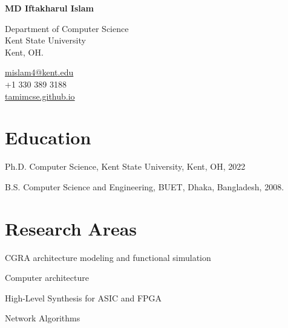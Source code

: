 \documentclass[11pt,letterpaper]{report}
\newcommand{\myname}{MD Iftakharul Islam}
\newcommand{\namefont}[1]{{\normalfont\bfseries\Huge{#1}}}
\newcommand{\listitemspace}{0.25em}
\renewenvironment{itemize}
{\begin{list}{}{\setlength{\leftmargin}{0em}
                \setlength{\parskip}{0em}
                \setlength{\itemsep}{\listitemspace}
                \setlength{\parsep}{\listitemspace}}}
{\end{list}}
\begin{document}
    \raggedright{}

    \namefont{\myname}

    \vspace{1em}
    \begin{minipage}[t]{0.700\textwidth}
        Department of Computer Science \\
        Kent State University \\
        Kent, OH.
    \end{minipage}
    \begin{minipage}[t]{0.295\textwidth}
        \flushright{}
        \href{mailto:mislam4@kent.edu}{mislam4@kent.edu} \\
        +1 330 389 3188 \\
        \href{https://tamimcse.github.io/}{tamimcse.github.io}
    \end{minipage}


    \section*{Education}

    \begin{tablist}

        \item[Ph.D.] \tab{}Computer Science, Kent State University, Kent, OH, 2022
        \item[B.S.]  \tab{}Computer Science and Engineering, BUET, Dhaka, Bangladesh, 2008.

    \end{tablist}


    \section*{Research Areas}

    \begin{itemize}

        \item CGRA architecture modeling and functional simulation
        \item Computer architecture
        \item High-Level Synthesis for ASIC and FPGA
        \item Network Algorithms

    \end{itemize}
\end{document}
